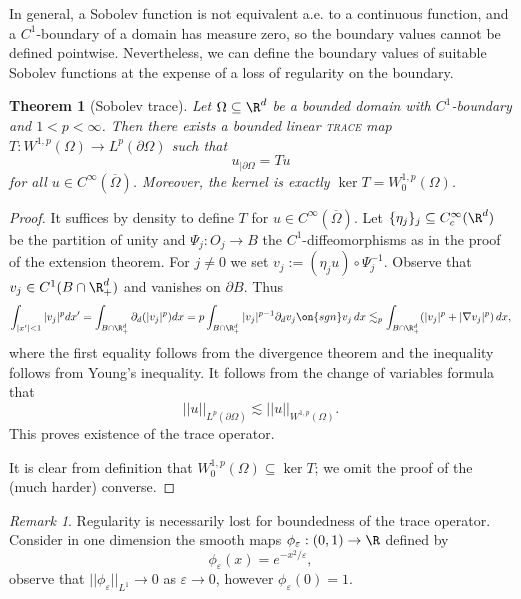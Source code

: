 \documentclass[reqno]{amsart}
\newtheorem{theorem}{Theorem}
\theoremstyle{definition}
\theoremstyle{remark}
\newtheorem*{remark}{Remark}
\renewcommand{\epsilon}{\varepsilon}
\renewcommand{\emph}{\textsc}
\begin{document}
In general, a Sobolev function is not equivalent a.e. to a continuous function, and a $C^1$-boundary of a domain has measure zero, so the boundary values cannot be defined pointwise. Nevertheless, we can define the boundary values of suitable Sobolev functions at the expense of a loss of regularity on the boundary. 

\begin{theorem}[Sobolev trace]
	Let $\Omega \subseteq \R^d$ be a bounded domain with $C^1$-boundary and $1 < p < \infty$. Then there exists a bounded linear \emph{trace} map $T: W^{1, p} (\Omega) \to L^p (\partial \Omega)$ such that 
		\[ u_{|\partial \Omega} = Tu \]
	for all $u \in C^\infty (\overline \Omega)$. Moreover, the kernel is exactly $\ker T = W_0^{1, p} (\Omega)$.  	 
\end{theorem}

\begin{proof}
	It suffices by density to define $T$ for $u \in C^\infty (\overline \Omega)$. Let $\{ \eta_j \}_j \subseteq C^\infty_c (\R^d)$ be the partition of unity  and $\Psi_j : O_j \to B$ the $C^1$-diffeomorphisms as in the proof of the extension theorem. For $j \neq 0$ we set $v_j := (\eta_j u) \circ \Psi_j^{-1}$. Observe that $v_j \in C^1 (B \cap \R^d_+)$ and vanishes on $\partial B$. Thus
		\begin{align*}
			\int_{|x'| < 1} |v_j|^p dx' =  \int_{B \cap \R^d_+} \partial_d (|v_j|^p) dx =  p \int_{B \cap \R^d_+} |v_j|^{p - 1} \partial_d v_j \on{sgn} v_j \, dx \lesssim_p \int_{B \cap \R^d_+} (|v_j|^p + |\nabla v_j|^p) \, dx,
		\end{align*}	
	where the first equality follows from the divergence theorem and the inequality follows from Young's inequality. It follows from the change of variables formula that
		\[ ||u||_{L^p (\partial \Omega)} \lesssim ||u||_{W^{1, p} (\Omega)}. \]
	This proves existence of the trace operator.
	
	It is clear from definition that $W^{1, p}_0 (\Omega) \subseteq \ker T$; we omit the proof of the (much harder) converse. 
\end{proof}

\begin{remark}
	Regularity is necessarily lost for boundedness of the trace operator. Consider in one dimension the smooth maps $\phi_\epsilon : (0, 1) \to \R$ defined by 
	\[ \phi_\epsilon (x) = e^{-x^2/\epsilon} , \]
observe that $||\phi_\epsilon||_{L^1} \to 0$ as $\epsilon \to 0$, however $\phi_\epsilon (0) = 1$. 
\end{remark}
\end{document}
